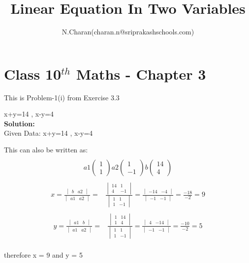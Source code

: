 \documentclass[12pt]{article}
\title{Linear Equation In Two Variables}
\author{N.Charan(charan.n@sriprakashschools.com)}
\newcommand{\myvec}[1]{\ensuremath{\begin{pmatrix}#1\end{pmatrix}}}
\newcommand{\mydet}[1]{\ensuremath{\begin{vmatrix}#1\end{vmatrix}}}
\newcommand{\solution}{\noindent \textbf{Solution: }}
\begin{document}
\maketitle
\section*{Class 10$^{th}$ Maths - Chapter 3}
This is Problem-1(i) from Exercise 3.3
\item  x+y=14 , x-y=4 \\

\solution \\
Given Data: x+y=14 , x-y=4

This can also be written as:
\begin{align}
\\a1 \myvec{1\\1} a2 \myvec{1\\-1}b\myvec{14\\4}
\end{align}
\begin{align}
\\x = \frac{\mydet{ b & a2}}{\mydet{ a1 & a2}} =&
\frac{\mydet{ 14 & 1\\ 4 & -1}}{\mydet{1&1\\1&-1}}= \frac{\mydet{ -14 &-4 }}{\mydet{ -1&-1 }}= \frac{-18}{-2}=9
\end{align}
\begin{align}
\\y = \frac{\mydet{ a1 & b}}{\mydet{ a1 & a2}} =&
\frac{\mydet{ 1 & 14 \\ 1 & 4}}{\mydet{1&1\\1&-1}}=   \frac{\mydet{ 4 & -14}}{\mydet{ -1 & -1}} = \frac{-10}{-2}=5 
\end{align}
\\ therefore x = 9 and y = 5


 
\end{document}
